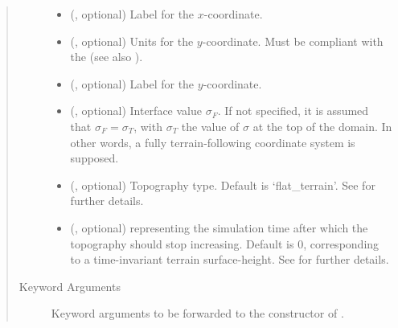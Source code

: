 \documentclass[letterpaper,10pt,english]{sphinxmanual}
\begin{document}
\begin{fulllineitems}
\begin{fulllineitems}
\begin{quote}
\begin{description}
\begin{itemize}
\item {} 
 (, optional) \textendash{} Label for the \(x\)-coordinate.

\item {} 
 (, optional) \textendash{} 
Units for the \(y\)-coordinate. Must be compliant with the 
(see also {\hyperref[\detokenize{api:grids.axis.Axis.__init__}]{}}).


\item {} 
 (, optional) \textendash{} Label for the \(y\)-coordinate.

\item {} 
 (, optional) \textendash{} Interface value \(\sigma_F\). If not specified, it is assumed that \(\sigma_F = \sigma_T\),
with \(\sigma_T\) the value of  \(\sigma\) at the top of the domain. In other words, a fully
terrain-following coordinate system is supposed.

\item {} 
 (, optional) \textendash{} Topography type. Default is ‘flat\_terrain’. See {\hyperref[\detokenize{api:module-grids.topography}]{}} for further details.

\item {} 
 (, optional) \textendash{}  representing the simulation time after which the topography should stop
increasing. Default is 0, corresponding to a time-invariant terrain surface-height.
See {\hyperref[\detokenize{api:module-grids.topography}]{}} for further details.

\end{itemize}

\item[{Keyword Arguments}] \leavevmode
{} \textendash{} Keyword arguments to be forwarded to the constructor of {\hyperref[\detokenize{api:grids.topography.Topography2d}]{}}.

\end{description}\end{quote}


\end{fulllineitems}
\end{fulllineitems}
\end{document}
